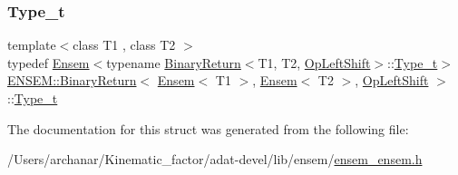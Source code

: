 \subsubsection{\texorpdfstring{Type\_t}{Type\_t}\hspace{0.1cm}{\footnotesize\ttfamily [3/3]}}
{\footnotesize\ttfamily template$<$class T1 , class T2 $>$ \\
typedef \mbox{\hyperlink{classENSEM_1_1Ensem}{Ensem}}$<$typename \mbox{\hyperlink{structENSEM_1_1BinaryReturn}{Binary\+Return}}$<$T1, T2, \mbox{\hyperlink{structENSEM_1_1OpLeftShift}{Op\+Left\+Shift}}$>$\+::\mbox{\hyperlink{structENSEM_1_1BinaryReturn_3_01Ensem_3_01T1_01_4_00_01Ensem_3_01T2_01_4_00_01OpLeftShift_01_4_aed9853484e9cd6dbd5752114f8422cd1}{Type\+\_\+t}}$>$ \mbox{\hyperlink{structENSEM_1_1BinaryReturn}{E\+N\+S\+E\+M\+::\+Binary\+Return}}$<$ \mbox{\hyperlink{classENSEM_1_1Ensem}{Ensem}}$<$ T1 $>$, \mbox{\hyperlink{classENSEM_1_1Ensem}{Ensem}}$<$ T2 $>$, \mbox{\hyperlink{structENSEM_1_1OpLeftShift}{Op\+Left\+Shift}} $>$\+::\mbox{\hyperlink{structENSEM_1_1BinaryReturn_3_01Ensem_3_01T1_01_4_00_01Ensem_3_01T2_01_4_00_01OpLeftShift_01_4_aed9853484e9cd6dbd5752114f8422cd1}{Type\+\_\+t}}}



The documentation for this struct was generated from the following file\+:\begin{DoxyCompactItemize}
\item 
/\+Users/archanar/\+Kinematic\+\_\+factor/adat-\/devel/lib/ensem/\mbox{\hyperlink{adat-devel_2lib_2ensem_2ensem__ensem_8h}{ensem\+\_\+ensem.\+h}}\end{DoxyCompactItemize}
